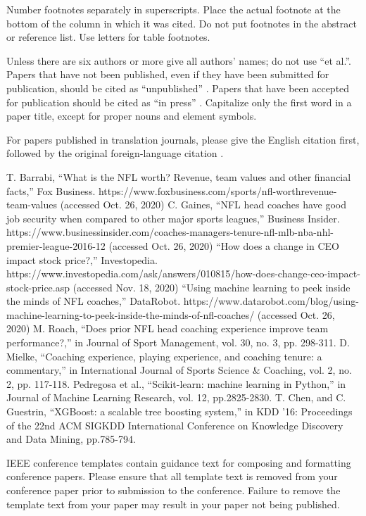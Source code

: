 \documentclass[conference]{IEEEtran}
\begin{document}
Number footnotes separately in superscripts. Place the actual footnote at 
the bottom of the column in which it was cited. Do not put footnotes in the 
abstract or reference list. Use letters for table footnotes.

Unless there are six authors or more give all authors' names; do not use 
``et al.''. Papers that have not been published, even if they have been 
submitted for publication, should be cited as ``unpublished'' \cite{b4}. Papers 
that have been accepted for publication should be cited as ``in press'' \cite{b5}. 
Capitalize only the first word in a paper title, except for proper nouns and 
element symbols.

For papers published in translation journals, please give the English 
citation first, followed by the original foreign-language citation \cite{b6}.

\begin{thebibliography}{00}
 T. Barrabi, ``What is the NFL worth? Revenue, team values and other financial facts,'' Fox Business. https://www.foxbusiness.com/sports/nfl-worthrevenue-team-values (accessed Oct. 26, 2020)
 C. Gaines, ``NFL head coaches have good job security when compared to other major sports leagues,'' Business Insider. https://www.businessinsider.com/coaches-managers-tenure-nfl-mlb-nba-nhl-premier-league-2016-12 (accessed Oct. 26, 2020)
 ``How does a change in CEO impact stock price?,'' Investopedia. https://www.investopedia.com/ask/answers/010815/how-does-change-ceo-impact-stock-price.asp (accessed Nov. 18, 2020)
 ``Using machine learning to peek inside the minds of NFL coaches,'' DataRobot. https://www.datarobot.com/blog/using-machine-learning-to-peek-inside-the-minds-of-nfl-coaches/ (accessed Oct. 26, 2020)
 M. Roach, ``Does prior NFL head coaching experience improve team performance?,'' in Journal of Sport Management, vol. 30, no. 3, pp. 298-311.
 D. Mielke, ``Coaching experience, playing experience, and coaching tenure: a commentary,'' in International Journal of Sports Science \& Coaching, vol. 2, no. 2, pp. 117-118.
 Pedregosa et al., ``Scikit-learn: machine learning in Python,'' in Journal of Machine Learning Research, vol. 12, pp.2825-2830.
 T. Chen, and C. Guestrin, ``XGBoost: a scalable tree boosting system,'' in KDD '16: Proceedings of the 22nd ACM SIGKDD International Conference on Knowledge Discovery and Data Mining, pp.785-794.
\end{thebibliography}
\vspace{12pt}
\color{red}
IEEE conference templates contain guidance text for composing and formatting conference papers. Please ensure that all template text is removed from your conference paper prior to submission to the conference. Failure to remove the template text from your paper may result in your paper not being published.
\end{document}
